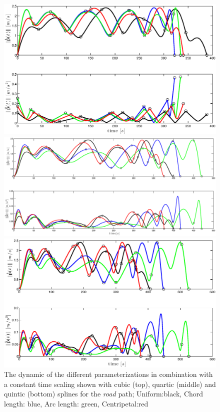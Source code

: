 \begin{figure}[H]
  \begin{minipage}[t]{0.9\textwidth}
    \includegraphics[width = \textwidth]{graphics/Parameterization3_road_vel_acc.eps}
  \end{minipage}
  \vfill
    \begin{minipage}[t]{0.9\textwidth}
    \includegraphics[width = \textwidth]{graphics/Parameterization4_road_vel_acc.eps}
  \end{minipage}
  \vfill
    \begin{minipage}[t]{0.9\textwidth}
    \includegraphics[width = \textwidth]{graphics/Parameterization5_road_vel_acc.eps}
  \end{minipage}
  \caption{The dynamic of the different parameterizations in combination with a constant time scaling shown with cubic (top), quartic (middle) and quintic (bottom) splines for the \textit{road} path; Uniform:black, Chord length: blue, Arc length: green, Centripetal:red}
  \label{fig:parameterization_cqq}
\end{figure}

